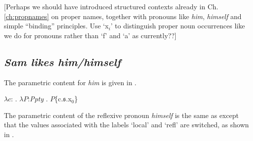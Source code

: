 [Perhaps we should have introduced structured contexts already in
Ch. \ref{ch:propnames} on proper names, together with pronouns like
\textit{him}, \textit{himself} and simple ``binding'' principles.  Use
`x$_i$' to distinguish proper noun occurrences like we do for pronouns rather
than `f' and `a' as currently??]

\subsection{\textit{Sam likes him/himself}}

The parametric content for \textit{him} is given in \nexteg{}.

\begin{ex} 
$\lambda
c$: . 
$\lambda P$:\textit{Ppty} . $P$\{c.$\mathfrak{s}$.x$_0$\}
\end{ex} 

The parametric content of the reflexive pronoun \textit{himself} is
the same as \preveg{} except that the values associated with the
labels `local' and `refl' are switched, as shown in \nexteg{}.

